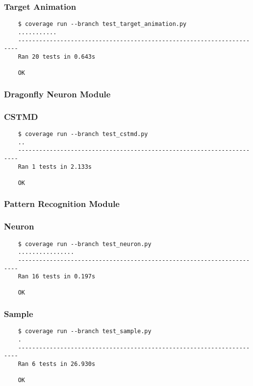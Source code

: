 \documentclass[a4paper,11pt]{article}
\begin{document}
\subsubsection*{{\hspace{6mm}}Target Animation}
\begin{verbatim}
    $ coverage run --branch test_target_animation.py
    ...........
    ----------------------------------------------------------------------
    Ran 20 tests in 0.643s

    OK
\end{verbatim}

\subsubsection{Dragonfly Neuron Module}
\subsubsection*{{\hspace{6mm}}CSTMD}
\begin{verbatim}
    $ coverage run --branch test_cstmd.py
    ..
    ----------------------------------------------------------------------
    Ran 1 tests in 2.133s

    OK
\end{verbatim}

\subsubsection{Pattern Recognition Module}
\subsubsection*{{\hspace{6mm}}Neuron}
\begin{verbatim}
    $ coverage run --branch test_neuron.py
    ................
    ----------------------------------------------------------------------
    Ran 16 tests in 0.197s

    OK
\end{verbatim}

\subsubsection*{{\hspace{6mm}}Sample}
\begin{verbatim}
    $ coverage run --branch test_sample.py
    .
    ----------------------------------------------------------------------
    Ran 6 tests in 26.930s

    OK
\end{verbatim}
\end{document}
